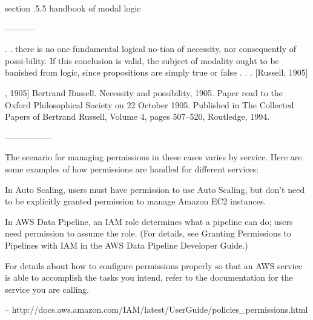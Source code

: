 section .5.5 handbook of modal logic

-----------

. . there is no one fundamental logical no-tion of necessity, nor
consequently of possi-bility. If this conclusion is valid, the subject
of modality ought to be banished from logic, since propositions are
simply true or false . . . [Russell, 1905]

, 1905] Bertrand Russell. Necessity and possibility, 1905. Paper read
to the Oxford Philosophical Society on 22 October 1905. Published in
The Collected Papers of Bertrand Russell, Volume 4, pages 507–520,
Routledge, 1994.


-----------------

The scenario for managing permissions in these cases varies by
service. Here are some examples of how permissions are handled for
different services:

In Auto Scaling, users must have permission to use Auto Scaling, but
don't need to be explicitly granted permission to manage Amazon EC2
instances.

In AWS Data Pipeline, an IAM role determines what a pipeline can do;
users need permission to assume the role. (For details, see Granting
Permissions to Pipelines with IAM in the AWS Data Pipeline Developer
Guide.)

For details about how to configure permissions properly so that an AWS
service is able to accomplish the tasks you intend, refer to the
documentation for the service you are calling.

-- http://docs.aws.amazon.com/IAM/latest/UserGuide/policies_permissions.html

